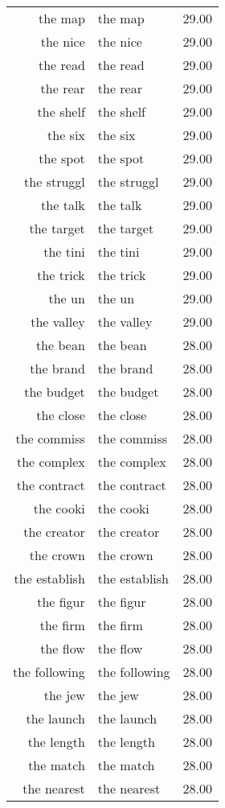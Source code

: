 \begin{table}[ht]
\begin{tabular}{rlr}
  the map & the map & 29.00 \\ 
  the nice & the nice & 29.00 \\ 
  the read & the read & 29.00 \\ 
  the rear & the rear & 29.00 \\ 
  the shelf & the shelf & 29.00 \\ 
  the six & the six & 29.00 \\ 
  the spot & the spot & 29.00 \\ 
  the struggl & the struggl & 29.00 \\ 
  the talk & the talk & 29.00 \\ 
  the target & the target & 29.00 \\ 
  the tini & the tini & 29.00 \\ 
  the trick & the trick & 29.00 \\ 
  the un & the un & 29.00 \\ 
  the valley & the valley & 29.00 \\ 
  the bean & the bean & 28.00 \\ 
  the brand & the brand & 28.00 \\ 
  the budget & the budget & 28.00 \\ 
  the close & the close & 28.00 \\ 
  the commiss & the commiss & 28.00 \\ 
  the complex & the complex & 28.00 \\ 
  the contract & the contract & 28.00 \\ 
  the cooki & the cooki & 28.00 \\ 
  the creator & the creator & 28.00 \\ 
  the crown & the crown & 28.00 \\ 
  the establish & the establish & 28.00 \\ 
  the figur & the figur & 28.00 \\ 
  the firm & the firm & 28.00 \\ 
  the flow & the flow & 28.00 \\ 
  the following & the following & 28.00 \\ 
  the jew & the jew & 28.00 \\ 
  the launch & the launch & 28.00 \\ 
  the length & the length & 28.00 \\ 
  the match & the match & 28.00 \\ 
  the nearest & the nearest & 28.00 \\ 

\end{tabular}
\end{table}

